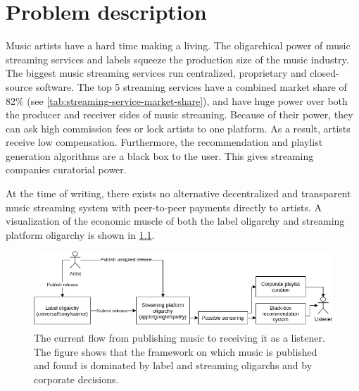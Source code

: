 \chapter{\label{chap:related-work}Problem description}
Music artists have a hard time making a living. The oligarchical power of music streaming services and labels squeeze the production size of the music industry. The biggest music streaming services run centralized, proprietary and closed-source software. The top 5 streaming services have a combined market share of 82\% (see \ref{tab:streaming-service-market-share}), and have huge power over both the producer and receiver sides of music streaming. Because of their power, they can ask high commission fees or lock artists to one platform. As a result, artists receive low compensation. Furthermore, the recommendation and playlist generation algorithms are a black box to the user. This gives streaming companies curatorial power. 

At the time of writing, there exists no alternative decentralized and transparent music streaming system with peer-to-peer payments directly to artists. A visualization of the economic muscle of both the label oligarchy and streaming platform oligarchy is shown in \ref{fig:current-music-publishing-situation}.

\begin{figure}
    \centering
    \includegraphics[width=1\linewidth]{problem-description/current-music-publishing-situation.png}
    \caption{The current flow from publishing music to receiving it as a listener. The figure shows that the framework on which music is published and found is dominated by label and streaming oligarchs and by corporate decisions.}
    \label{fig:current-music-publishing-situation}
\end{figure}

